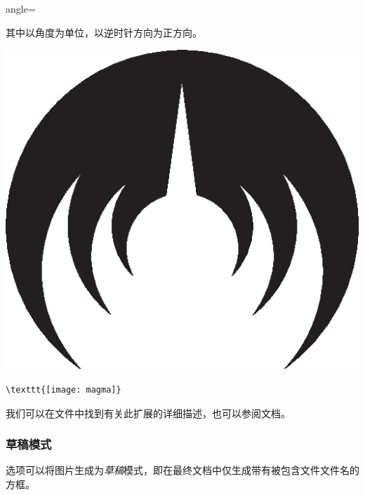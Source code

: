 \begin{dmd}
angle=
\end{dmd}

其中以角度为单位，以逆时针方向为正方向。

\begin{codelist}[5.4]{
\includegraphics[angle=45,
                 scale=0.2]{img/magma}
}
\begin{verbatim}
\texttt{[image: magma]}\end{verbatim}
\end{codelist}

我们可以在文件中找到有关此扩展的详细描述，也可以参阅文档。

\subsubsection{草稿模式}

选项可以将图片生成为\emph{草稿}模式，即在最终文档中仅生成带有被包含文件文件名的方框。


